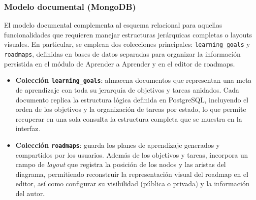 \subsubsection{Modelo documental (MongoDB)}

El modelo documental complementa al esquema relacional para aquellas funcionalidades que
requieren manejar estructuras jerárquicas completas o layouts visuales. En particular, se emplean
dos colecciones principales: \texttt{learning\_goals} y \texttt{roadmaps}, definidas en bases de datos
separadas para organizar la información persistida en el módulo de Aprender a Aprender y
en el editor de roadmaps.

\begin{itemize}
  \item \textbf{Colección \texttt{learning\_goals}}: almacena documentos que representan una meta
  de aprendizaje con toda su jerarquía de objetivos y tareas anidados. Cada documento replica la
  estructura lógica definida en PostgreSQL, incluyendo el orden de los objetivos y la organización de
  tareas por estado, lo que permite recuperar en una sola consulta la estructura completa que se
  muestra en la interfaz.

  \item \textbf{Colección \texttt{roadmaps}}: guarda los planes de aprendizaje generados y
  compartidos por los usuarios. Además de los objetivos y tareas, incorpora un campo de
  \textit{layout} que registra la posición de los nodos y las aristas del diagrama, permitiendo
  reconstruir la representación visual del roadmap en el editor, así como configurar su visibilidad
  (pública o privada) y la información del autor.
\end{itemize}

